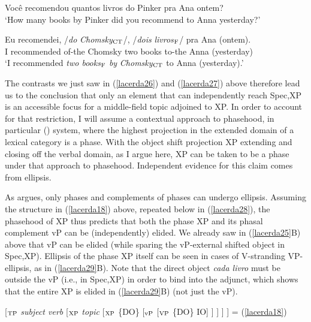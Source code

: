 \documentclass[output=paper]{langscibook}
\begin{document}
\begin{exe}
\ex \label{lacerda27}
\begin{xlist}
 \label{lacerda27A}
Você recomendou quantos livros do Pinker pra Ana ontem?\\
‘How many books by Pinker did you recommend to Anna yesterday?’	

 \label{lacerda27B}
\gll {}Eu 	recomendei, 	/\emph{do}	 \emph{Chomsky}$_{\textnormal{CT}}$/,	/\emph{dois} 	\emph{livros}$_{\textnormal{F}}$/	pra 	Ana	(ontem).\\
I 	recommended	of-the 	Chomsky 	two	books 	to-the 	Anna	(yesterday)\\
\glt‘I recommended \emph{two books}$_{\textnormal{F}}$ \emph{by} \emph{Chomsky}$_{\textnormal{CT}}$ to Anna (yesterday).’

\end{xlist}
\end{exe}

The contrasts we just saw in (\ref{lacerda26}) and (\ref{lacerda27}) above therefore lead us to the conclusion that only an element that can independently reach Spec,XP is an accessible focus for a middle-field topic adjoined to XP. In order to account for that restriction, I will assume a contextual approach to phasehood, in particular  (\citeyear{boskovic2014}) system, where the highest projection in the extended domain of a lexical category is a phase. With the object shift projection XP extending and closing off the verbal domain, as I argue here, XP can be taken to be a phase under that approach to phasehood. Independent evidence for this claim comes from ellipsis.

As \citeauthor{boskovic2014} \citeyear{boskovic2014} argues, only phases and complements of phases can undergo ellipsis. Assuming the structure in (\ref{lacerda18}) above, repeated below in (\ref{lacerda28}), the phasehood of XP thus predicts that both the phase XP and its phasal complement vP can be (independently) elided. We already saw in (\ref{lacerda25}B) above that vP can be elided (while sparing the vP-external shifted object in Spec,XP). Ellipsis of the phase XP itself can be seen in cases of V-stranding VP-ellipsis, as in (\ref{lacerda29}B). Note that the direct object \emph{cada livro} must be outside the vP (i.e., in Spec,XP) in order to bind into the adjunct, which shows that the entire XP is elided in (\ref{lacerda29}B) (not just the vP).

\begin{exe}
\ex \label{lacerda28}
[$_{\textnormal{TP}}$ \emph{subject verb} [$_{\textnormal{XP}}$ \emph{topic} [$_{\textnormal{XP}}$ \{DO\} [$_{\textnormal{vP}}$ [$_{\textnormal{VP}}$ \{DO\} IO] ] ] ] ] = (\ref{lacerda18})

\end{exe}
\end{document}
